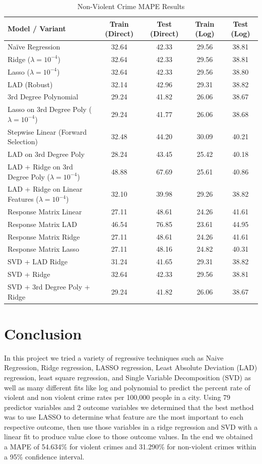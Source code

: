 \documentclass{article}
\begin{document}
\begin{table}[htbp]
\centering
\caption{Non-Violent Crime MAPE Results}
\begin{tabular}{lcccc}
\hline
Model / Variant & Train (Direct) & Test (Direct) & Train (Log) & Test (Log) \\
\hline
Na\"ive Regression & 32.64 & 42.33 & 29.56 & 38.81 \\
Ridge ($\lambda=10^{-4}$) & 32.64 & 42.33 & 29.56 & 38.81 \\
Lasso ($\lambda=10^{-4}$) & 32.64 & 42.33 & 29.56 & 38.80 \\
LAD (Robust) & 32.14 & 42.96 & 29.31 & 38.82 \\
3rd Degree Polynomial & 29.24 & 41.82 & 26.06 & 38.67 \\
Lasso on 3rd Degree Poly ($\lambda=10^{-4}$) & 29.24 & 41.77 & 26.06 & 38.68 \\
Stepwise Linear (Forward Selection) & 32.48 & 44.20 & 30.09 & 40.21 \\
LAD on 3rd Degree Poly & 28.24 & 43.45 & 25.42 & 40.18 \\
LAD + Ridge on 3rd Degree Poly ($\lambda=10^{-4}$) & 48.88 & 67.69 & 25.61 & 40.86 \\
LAD + Ridge on Linear Features ($\lambda=10^{-4}$) & 32.10 & 39.98 & 29.26 & 38.82 \\
Response Matrix Linear & 27.11 & 48.61 & 24.26 & 41.61 \\
Response Matrix LAD & 46.54 & 76.85 & 23.61 & 44.95 \\
Response Matrix Ridge & 27.11 & 48.61 & 24.26 & 41.61 \\
Response Matrix Lasso & 27.11 & 48.16 & 24.82 & 40.31 \\
SVD + LAD Ridge & 31.24 & 41.65 & 29.31 & 38.82 \\
SVD + Ridge & 32.64 & 42.33 & 29.56 & 38.81 \\
SVD + 3rd Degree Poly + Ridge & 29.24 & 41.82 & 26.06 & 38.67 \\
\hline
\end{tabular}
\end{table}

\section{Conclusion}
In this project we tried a variety of regressive techniques such as Naive Regression, Ridge regression, LASSO regression, Least Absolute Deviation (LAD) regression, least square regression, and Single Variable Decomposition (SVD) as well as many different fits like log and polynomial to predict the percent rate of violent and non violent crime rates per 100,000 people in a city. Using 79 predictor variables and 2 outcome variables we determined that the best method was to use LASSO to determine what feature are the most important to each respective outcome, then use those variables in a ridge regression and SVD with a linear fit to produce value close to those outcome values. In the end we obtained a MAPE of 54.634\% for violent crimes and 31.290\% for non-violent crimes within a 95\% confidence interval. 
\end{document}
